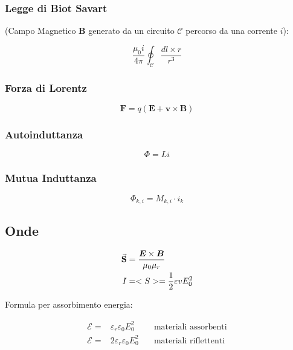 \documentclass[a4paper]{scrarticle}
\begin{document}
\subsubsection*{Legge di Biot Savart} 
(Campo Magnetico $\bm B$  generato da un circuito $\mathcal{C}$ percorso da una corrente $i$):

\begin{equation}
    \frac{\mu_0 i}{4 \pi} \oint_{\mathcal{C}} \frac {dl \times r}{r^3}
\end{equation}

\subsubsection*{Forza di Lorentz}

\begin{equation}
   \bm F = q (\bm E + \bm v \times \bm B )
\end{equation}

\subsubsection*{Autoinduttanza}
\begin{equation}
    \varPhi = L i
\end{equation}

\subsubsection*{Mutua Induttanza} 
\begin{equation}
    \varPhi_{k, i} = M_{k , i} \cdot i_k 
\end{equation}



\subsection{Onde}

\begin{align}
    \va S & = \frac{\bm E \times \bm B}{\mu_0 \mu_r}\\
    I & = <S> = \frac{1}{2}\varepsilon v E^2_0
\end{align}

Formula per assorbimento energia:

\begin{align}
    \mathcal E =&  \varepsilon_r \varepsilon_0 E_0^2\quad &\text {materiali assorbenti}\\
    \mathcal E =& 2\varepsilon_r \varepsilon_0 E_0^2\quad &\text {materiali riflettenti}
\end{align}
\end{document}
